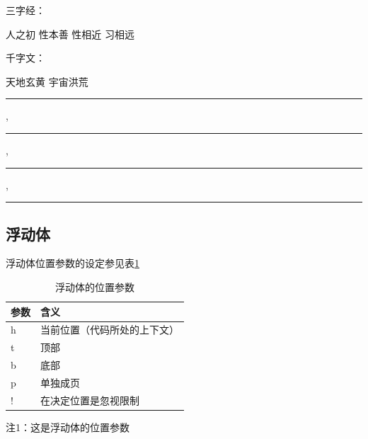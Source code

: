 \documentclass{article}
\begin{document}
	三字经：\parbox[t]{3em}%
	{人之初 性本善 性相近 习相远}
	\qquad
	千字文：
	\begin{minipage}[b][8ex][t]{4em}
		天地玄黄 宇宙洪荒
	\end{minipage}

	
	\rule{12pt}{4pt},\rule[4pt]{6pt}{8pt},\rule[-4pt]{6pt}{8pt},\rule[-.4pt]{3em}{.4pt}
	
	
	
	\subsection{浮动体}
	浮动体位置参数的设定参见表\ref{表1}
	\begin{table}[h]
		\caption{浮动体的位置参数}\label{表1}
		\centering
		\begin{threeparttable}
			\begin{tabular}{ll}
				\hline
				参数 & 含义\\
				\hline
				h   &  当前位置（代码所处的上下文）\\
				t   &  顶部\\
				b   &  底部\\
				p   &  单独成页\\
				!   &  在决定位置是忽视限制\\
				\hline
			\end{tabular}
		\end{threeparttable}
	
		\begin{tablenotes}
			
			\footnotesize
			\item 注1：这是浮动体的位置参数
		\end{tablenotes}
		
	\end{table}
\end{document}
